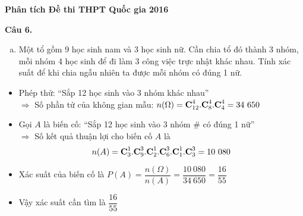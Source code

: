 \documentclass[11pt]{beamer} %
\newcommand{\C}{\mbox{\textbf{C}}}
\newcommand{\cau}[2]{\begin{block}{}
		{\color{red}\textbf{Câu #1.}} #2
	\end{block}
}
\begin{document}
\begin{frame}{\textbf{\qquad Phân tích Đề thi THPT Quốc gia 2016}}~\\[-18pt]
	\cau{6}{\begin{enumerate}[b)]
			\item Một tổ gồm 9 học sinh nam và 3 học sinh nữ. Cần chia tổ đó thành 3 nhóm, mỗi nhóm 4 học sinh để đi làm 3 công việc trực nhật khác nhau. Tính xác suất để khi chia ngẫu nhiên ta được mỗi nhóm có đúng 1 nữ.
		\end{enumerate}}\pause
	\begin{itemize}
		\item<+-|alert@+> Phép thử: ``Sắp 12 học sinh vào 3 nhóm khác nhau''\\[4pt]
		$\Rightarrow$ Số phần tử của không gian mẫu: $n(\Omega)=\C_{12}^4.\C^4_8.\C_4^4=34~ 650$\\[5pt]
		\item<+-|alert@+> Gọi $A$ là biến cố: ``Sắp 12 học sinh vào 3 nhóm \# có đúng 1 nữ''\\[4pt]
		$\Rightarrow$ Số kết quả thuận lợi cho biến cố $A$ là $$n(A)=\C_3^1.\C_9^3.\C_2^1.\C_6^3.\C^1_1.\C^3_3=10~080$$
		\item<+-|alert@+> Xác suất của biến cố là
		$P(A)=\dfrac{n(\Omega)}{n(A)}=\dfrac{10~080}{34~ 650}=\dfrac{16}{55}$\\
		\item<+-|alert@+> Vậy xác suất cần tìm là $\dfrac{16}{55}$
	\end{itemize}
\end{frame}
\end{document}
